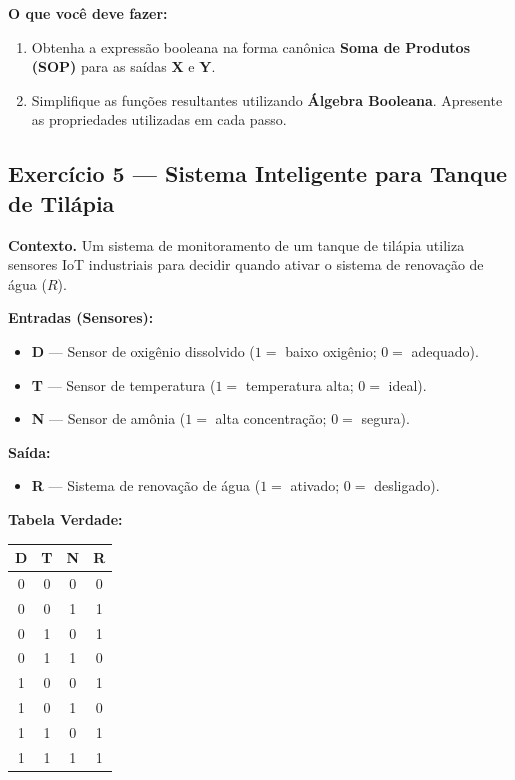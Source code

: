 \documentclass[12pt]{article}
\begin{document}
\bigskip

\noindent\textbf{O que você deve fazer:}

\begin{enumerate}[label=\textbf{\alph*)}, leftmargin=2cm]
  \item Obtenha a expressão booleana na forma canônica \textbf{Soma de Produtos (SOP)}
        para as saídas \textbf{X} e \textbf{Y}.
  \item Simplifique as funções resultantes utilizando \textbf{Álgebra Booleana}. 
        Apresente as propriedades utilizadas em cada passo.
\end{enumerate}


\newpage
\subsection*{Exercício 5 — Sistema Inteligente para Tanque de Tilápia}

\textbf{Contexto.}
Um sistema de monitoramento de um tanque de tilápia utiliza sensores IoT 
industriais para decidir quando ativar o sistema de renovação de água ($R$).

\textbf{Entradas (Sensores):}

\begin{itemize}[leftmargin=1.5cm, label=\textbullet]
  \item \textbf{D} — Sensor de oxigênio dissolvido ($1 = $ baixo oxigênio; $0 = $ adequado).
  \item \textbf{T} — Sensor de temperatura ($1 = $ temperatura alta; $0 = $ ideal).
  \item \textbf{N} — Sensor de amônia ($1 = $ alta concentração; $0 = $ segura).
\end{itemize}

\textbf{Saída:}

\begin{itemize}[leftmargin=1.5cm, label=\textbullet]
  \item \textbf{R} — Sistema de renovação de água ($1 = $ ativado; $0 = $ desligado).
\end{itemize}

\bigskip

\noindent\textbf{Tabela Verdade:}

\begin{center}
\renewcommand{\arraystretch}{1.2}
\begin{tabular}{|c|c|c||c|}
  \hline
  \textbf{D} & \textbf{T} & \textbf{N} & \textbf{R} \\
  \hline
  0 & 0 & 0 & 0 \\
  0 & 0 & 1 & 1 \\
  0 & 1 & 0 & 1 \\
  0 & 1 & 1 & 0 \\
  1 & 0 & 0 & 1 \\
  1 & 0 & 1 & 0 \\
  1 & 1 & 0 & 1 \\
  1 & 1 & 1 & 1 \\
  \hline
\end{tabular}
\end{center}
\end{document}
